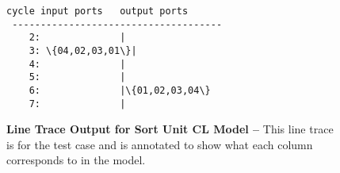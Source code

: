 
\begin{figure}

\hfill
\begin{minipage}{0.39\tw}
  \footnotesize
  \begin{Verbatim}[xleftmargin=0.1in,commandchars=\\\{\}]
 cycle input ports   output ports
 -------------------------------------
    2:              |
    3: \{04,02,03,01\}|
    4:              |
    5:              |
    6:              |\{01,02,03,04\}
    7:              |
  \end{Verbatim}
\end{minipage}
\hfill
\begin{minipage}{0.4\tw}
  \caption{\textbf{Line Trace Output for Sort Unit CL Model --} This line
    trace is for the  test case and is annotated to show
    what each column corresponds to in the model.}
  \label{fig-tut3-sort-cl-linetrace}
\end{minipage}
\hfill\mbox{}

\end{figure}

